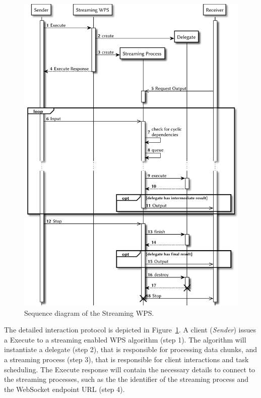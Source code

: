 		\begin{figure}[!htb]
			\centering
			\includegraphics[width=.7868\textwidth]{figures/sequence-diagramm-swps.pdf} %
			\caption{\label{fig:sd:swps} Sequence diagram of the Streaming WPS.}
		\end{figure}

		The detailed interaction protocol is depicted in Figure~\ref{fig:sd:swps}. A client (\emph{Sender}) issues a Execute to a streaming enabled WPS algorithm (step 1). The algorithm will instantiate a delegate (step 2), that is responsible for processing data chunks, and a streaming process (step 3), that is responsible for client interactions and task scheduling. The Execute response will contain the necessary details to connect to the streaming processes, such as the the identifier of the streaming process and the WebSocket endpoint URL (step 4).

